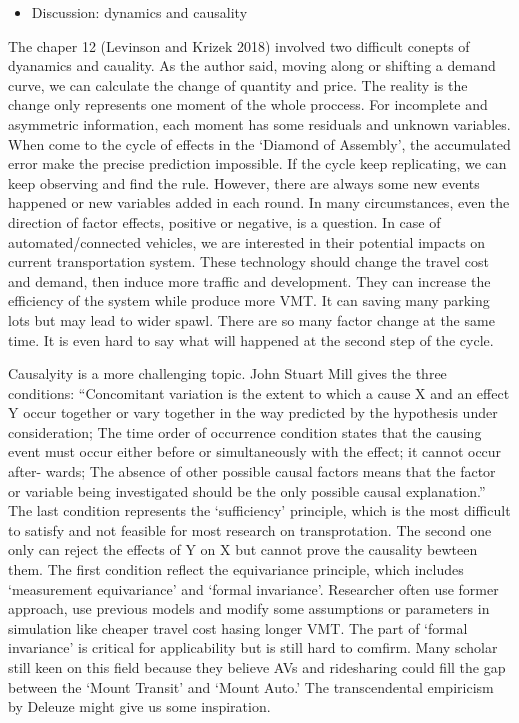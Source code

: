 \documentclass[12pt,]{article}
\providecommand{\tightlist}{%
  \setlength{\itemsep}{0pt}\setlength{\parskip}{0pt}}
\begin{document}
\begin{itemize}
\tightlist
\item
  Discussion: dynamics and causality
\end{itemize}

The chaper 12 (Levinson and Krizek 2018) involved two difficult conepts
of dyanamics and cauality. As the author said, moving along or shifting
a demand curve, we can calculate the change of quantity and price. The
reality is the change only represents one moment of the whole proccess.
For incomplete and asymmetric information, each moment has some
residuals and unknown variables. When come to the cycle of effects in
the `Diamond of Assembly', the accumulated error make the precise
prediction impossible. If the cycle keep replicating, we can keep
observing and find the rule. However, there are always some new events
happened or new variables added in each round. In many circumstances,
even the direction of factor effects, positive or negative, is a
question. In case of automated/connected vehicles, we are interested in
their potential impacts on current transportation system. These
technology should change the travel cost and demand, then induce more
traffic and development. They can increase the efficiency of the system
while produce more VMT. It can saving many parking lots but may lead to
wider spawl. There are so many factor change at the same time. It is
even hard to say what will happened at the second step of the cycle.

Causalyity is a more challenging topic. John Stuart Mill gives the three
conditions: ``Concomitant variation is the extent to which a cause X and
an effect Y occur together or vary together in the way predicted by the
hypothesis under consideration; The time order of occurrence condition
states that the causing event must occur either before or simultaneously
with the effect; it cannot occur after- wards; The absence of other
possible causal factors means that the factor or variable being
investigated should be the only possible causal explanation.'' The last
condition represents the `sufficiency' principle, which is the most
difficult to satisfy and not feasible for most research on
transprotation. The second one only can reject the effects of Y on X but
cannot prove the causality bewteen them. The first condition reflect the
equivariance principle, which includes `measurement equivariance' and
`formal invariance'. Researcher often use former approach, use previous
models and modify some assumptions or parameters in simulation like
cheaper travel cost hasing longer VMT. The part of `formal invariance'
is critical for applicability but is still hard to comfirm. Many scholar
still keen on this field because they believe AVs and ridesharing could
fill the gap between the `Mount Transit' and `Mount Auto.' The
transcendental empiricism by Deleuze might give us some inspiration.
\end{document}
